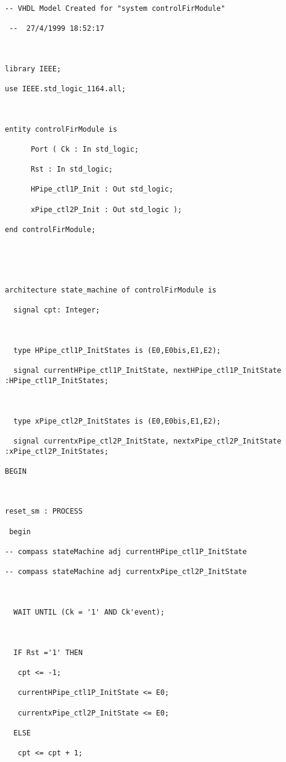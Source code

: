 \begin{verbatim}

-- VHDL Model Created for "system controlFirModule" 

 --  27/4/1999 18:52:17



library IEEE;

use IEEE.std_logic_1164.all;

  

entity controlFirModule is

      Port ( Ck : In std_logic;

      Rst : In std_logic;

      HPipe_ctl1P_Init : Out std_logic;

      xPipe_ctl2P_Init : Out std_logic );

end controlFirModule;





architecture state_machine of controlFirModule is

  signal cpt: Integer;



  type HPipe_ctl1P_InitStates is (E0,E0bis,E1,E2);

  signal currentHPipe_ctl1P_InitState, nextHPipe_ctl1P_InitState :HPipe_ctl1P_InitStates;



  type xPipe_ctl2P_InitStates is (E0,E0bis,E1,E2);

  signal currentxPipe_ctl2P_InitState, nextxPipe_ctl2P_InitState :xPipe_ctl2P_InitStates;

BEGIN 



reset_sm : PROCESS

 begin

-- compass stateMachine adj currentHPipe_ctl1P_InitState

-- compass stateMachine adj currentxPipe_ctl2P_InitState



  WAIT UNTIL (Ck = '1' AND Ck'event);



  IF Rst ='1' THEN 

   cpt <= -1;

   currentHPipe_ctl1P_InitState <= E0;

   currentxPipe_ctl2P_InitState <= E0;

  ELSE

   cpt <= cpt + 1;


\end{verbatim}

